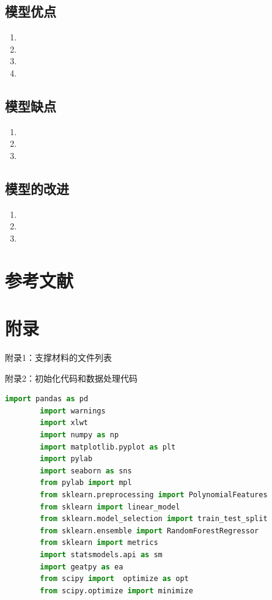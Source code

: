 \documentclass[a4paper]{article}
\begin{document}
	\subsection{模型优点}
	\begin{enumerate}
		\item 
		\item 
		\item 
		\item 
	\end{enumerate}
	
	\subsection{模型缺点}
	\begin{enumerate}
		\item 
		\item 
		\item 
	\end{enumerate}
	
	\subsection{模型的改进}
	\begin{enumerate}
		\item 
		\item 
		\item 
	\end{enumerate}
	
	\section{参考文献}
	\vspace{-2em} %
	\begin{thebibliography}{9}  
	\end{thebibliography}
	
	\newpage
	\section*{附录}
	
	附录1：支撑材料的文件列表
	
	
	附录2：初始化代码和数据处理代码
	\begin{lstlisting}[language=python,columns=fullflexible,frame=shadowbox]
		import pandas as pd
		import warnings
		import xlwt
		import numpy as np
		import matplotlib.pyplot as plt
		import pylab
		import seaborn as sns
		from pylab import mpl
		from sklearn.preprocessing import PolynomialFeatures
		from sklearn import linear_model
		from sklearn.model_selection import train_test_split
		from sklearn.ensemble import RandomForestRegressor
		from sklearn import metrics
		import statsmodels.api as sm
		import geatpy as ea
		from scipy import  optimize as opt
		from scipy.optimize import minimize
	\end{lstlisting}
	
\end{document}
